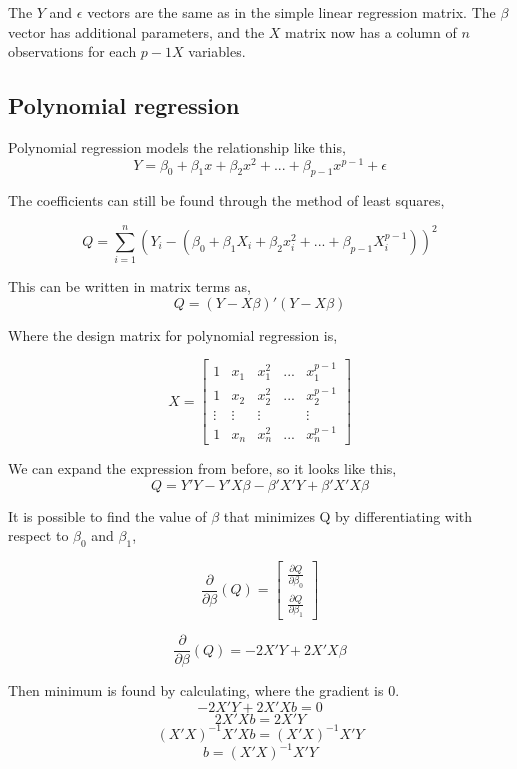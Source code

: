 	The $Y$ and $\epsilon$ vectors are the same as in the simple linear regression matrix. The $\beta$ vector has additional parameters, and the $X$ matrix now has a column of $n$ observations for each $p-1 X$ variables. \newline 
	
	\subsection{Polynomial regression}
	Polynomial regression models the relationship like this, 
	$$Y=\beta_0 + \beta_1 x + \beta_2 x^2	+ ... + \beta_{p-1} x^{p-1}+ \epsilon$$
	
	The coefficients can still be found through the method of least squares,
	
	$$Q=\sum_{i=1}^{n}(Y_i -(\beta_0 + \beta_1 X_i + \beta_2 x_i^2 + ... + \beta_{p-1}X_{i}^{p-1}))^2$$
	\newline
	
	This can be written in matrix terms as,
	$$Q=(Y-X\beta)' (Y-X\beta)$$
	
	Where the design matrix for polynomial regression is, 
	
	$$ X=
	\left[
	\begin{array}{ccccc}
		1&x_1&x_1^2&...&x_1^{p-1}\\ 
		1&x_2&x_2^2&...&x_2^{p-1} \\
		\vdots & \vdots &\vdots &&\vdots\\
		1&x_n&x_n^2&...&x_n^{p-1} 
	\end{array}
	\right]
	$$
	
	We can expand the expression from before, so it looks like this,
	$$Q=Y' Y -Y' X \beta -\beta' X' Y + \beta' X' X \beta$$
	
	
	It is possible to find the value of $\beta$ that minimizes Q by differentiating with respect to $\beta_0$ and $\beta_1$,
	
	$$
	\frac{\partial}{\partial \beta}(Q)=
	\left[
	\begin{array}{c}
		\frac{\partial Q}{\partial \beta_0}\\ 
		\frac{\partial Q}{\partial \beta_1}
	\end{array}
	\right]
	$$
	
	$$
	\frac{\partial}{\partial \beta}(Q)=-2 X' Y + 2X' X \beta$$
	
	Then minimum is found by calculating, where the gradient is 0.
	$$-2 X' Y+ 2X' X b=0$$
	$$ 2X' X b = 2X' Y$$
	$$(X' X)^{-1} X' X b = (X' X)^{-1} X' Y$$
	$$ b =(X' X)^{-1} X' Y$$
	
